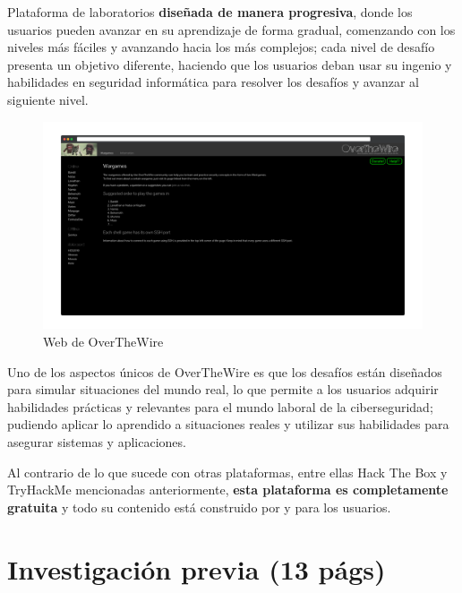         Plataforma de laboratorios \textbf{diseñada de manera progresiva}, donde los usuarios pueden avanzar en su aprendizaje de forma gradual, comenzando con los niveles más fáciles y avanzando hacia los más complejos; cada nivel de desafío presenta un objetivo diferente, haciendo que los usuarios deban usar su ingenio y habilidades en seguridad informática para resolver los desafíos y avanzar al siguiente nivel.
        
        \begin{figure}[h]
            \centering
            \includegraphics[width=\textwidth]{images/Capturas/Web de OverTheWire.png}
            \caption{Web de OverTheWire}
            \label{fig:OverTheWire-web}
        \end{figure}
        
        Uno de los aspectos únicos de OverTheWire es que los desafíos están diseñados para simular situaciones del mundo real, lo que permite a los usuarios adquirir habilidades prácticas y relevantes para el mundo laboral de la ciberseguridad; pudiendo aplicar lo aprendido a situaciones reales y utilizar sus habilidades para asegurar sistemas y aplicaciones.
        
        Al contrario de lo que sucede con otras plataformas, entre ellas Hack The Box y TryHackMe mencionadas anteriormente, \textbf{esta plataforma es completamente gratuita} y todo su contenido está construido por y para los usuarios.
        
        \cleardoublepage
    
    

\chapter{Investigación previa (13 págs)}
    \label{cap:investigacion-previa}

